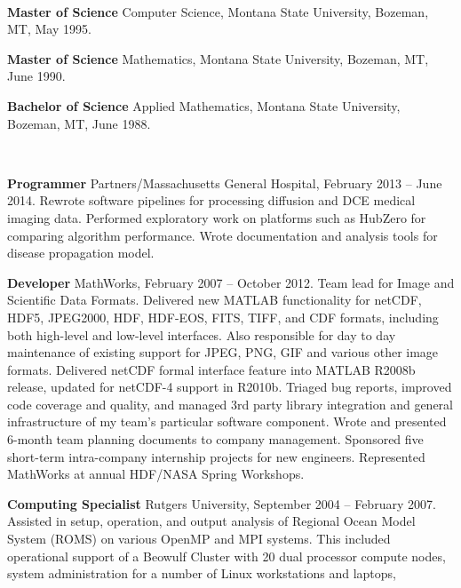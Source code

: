 \documentclass[11pt]{article}  %
\begin{document}
\bigskip 
{}\\ 
\begin{compactitem}
\item {\bf Master of Science} Computer Science, Montana State University, Bozeman,
    MT, May 1995.
  \item {\bf Master of Science} Mathematics, Montana State University, Bozeman,
    MT, June 1990.
  \item {\bf Bachelor of Science} Applied Mathematics, Montana State University,
    Bozeman, MT, June 1988.
\end{compactitem}

\bigskip 
{}\\ 
\begin{compactitem}
  \item {\bf Programmer}
    Partners/Massachusetts General Hospital, February 2013 -- June 2014.
    Rewrote software pipelines for processing diffusion and DCE medical
    imaging data.  Performed exploratory work on platforms such as
    HubZero  for comparing algorithm performance. Wrote documentation
    and analysis tools for disease propagation model.
  \item {\bf Developer}
    MathWorks, February 2007 -- October 2012.  Team lead for
    Image and Scientific Data Formats.  Delivered new MATLAB functionality
    for netCDF, HDF5, JPEG2000, HDF, HDF-EOS, FITS, TIFF, and CDF formats,
    including both high-level and low-level interfaces.  Also responsible
    for day to day maintenance of existing support for JPEG, PNG, GIF
    and various other image formats.  Delivered netCDF formal interface
    feature into MATLAB R2008b release, updated for netCDF-4 support
    in R2010b. Triaged bug reports, improved code coverage and quality,
    and managed 3rd party library integration and general infrastructure
    of my team's particular software component.  Wrote and presented
    6-month team planning documents to company management.  Sponsored
    five short-term intra-company internship projects for new engineers.
    Represented MathWorks at annual HDF/NASA Spring Workshops.
  \item {\bf Computing Specialist}
    Rutgers University, September 2004 -- February 2007. Assisted in
    setup,  operation, and output analysis  of Regional Ocean Model System
    (ROMS) on various OpenMP and MPI systems.  This included operational
    support of a Beowulf Cluster with 20 dual processor compute nodes,
    system administration for a number of Linux workstations and laptops,

\end{compactitem}
\end{document}
